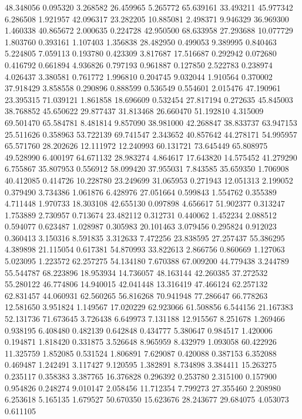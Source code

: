 48.348056
0.095320
3.268582
26.459965
5.265772
65.639161
33.493211
45.977342
6.286508
1.921957
42.096317
23.282205
10.885081
2.498371
9.946329
36.969300
1.460338
40.865672
2.000635
0.224728
42.950500
68.633958
27.293688
10.077729
1.803760
0.393161
1.107403
1.356838
28.482950
0.499053
9.389995
0.840463
5.224805
7.059113
0.193780
0.423309
3.817687
17.516687
0.292942
0.072680
0.416792
0.661894
4.936826
0.797193
0.961887
0.127850
2.522783
0.238974
4.026437
3.380581
0.761772
1.996810
0.204745
9.032044
1.910564
0.370002
37.918429
3.858558
0.290896
0.888599
0.536549
0.554601
2.015476
47.190961
23.395315
71.039121
1.861858
18.696609
0.532454
27.817194
0.272635
45.845003
38.768852
45.650622
29.877437
31.813468
26.660470
51.192810
4.315009
69.501470
65.584781
8.481814
9.857090
38.981000
42.268847
38.833737
63.947153
25.511626
0.358963
53.722139
69.741547
2.343652
40.857642
44.278171
54.995957
65.571760
28.202626
12.111972
12.240993
60.131721
73.645449
65.808975
49.528990
6.400197
64.671132
28.983274
4.864617
17.643820
14.575452
41.279290
6.755867
35.807953
0.556912
58.099420
37.955031
7.843585
35.659350
1.706908
40.412085
0.414726
10.228780
23.249699
31.065953
0.271943
12.051313
2.199052
0.379490
3.734386
1.061876
6.428976
27.051664
0.599843
1.554762
0.355389
4.711448
1.970733
18.303108
42.655130
0.097898
4.656617
51.902377
0.313247
1.753889
2.730957
0.713674
23.482112
0.312731
0.440062
1.452234
2.088512
0.594077
0.623487
1.028987
0.305983
20.101463
3.079456
0.295824
0.912023
0.360413
3.150316
8.591835
3.312633
7.472256
23.838595
27.257437
55.386295
4.389898
21.115054
0.617381
54.870993
33.822613
2.866756
0.860669
1.127063
5.023095
1.223572
62.257275
54.134180
7.670388
67.009200
44.779438
3.244789
55.544787
68.223896
18.953934
14.736057
48.163144
42.260385
37.272532
55.280122
46.774806
14.940015
42.041448
13.316419
47.466124
62.257132
62.831457
44.060931
62.560265
56.816268
70.941948
77.286647
66.778263
12.581650
3.951824
1.149567
17.020229
62.923066
61.508856
6.544156
21.167383
52.131736
71.673645
3.726438
6.649973
7.131188
12.915567
8.251678
1.269466
0.938195
6.408480
0.482139
0.642848
0.434777
5.380647
0.984517
1.420006
0.194871
1.818420
0.331875
3.526648
8.965959
8.432979
1.093058
60.422926
11.325759
1.852085
0.531524
1.806891
7.629087
0.420088
0.387153
6.352088
0.469487
1.242491
3.117427
9.120595
1.382891
8.734898
3.384411
15.263275
0.235117
0.358383
3.387765
16.376828
0.296392
0.253780
2.315100
0.157900
0.954826
0.248274
9.010147
2.058456
11.712354
7.799273
27.355460
2.208980
6.253618
5.165135
1.679527
50.670350
15.623676
28.243677
29.684075
4.053073
0.611105

